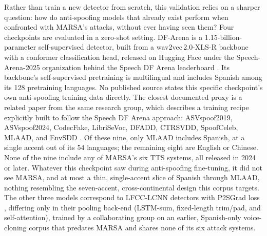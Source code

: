 \documentclass[11pt]{report}
\begin{document}
Rather than train a new detector from scratch, this validation relies
on a sharper question: how do anti-spoofing models that already exist
perform when confronted with MARSA's attacks, without ever having seen
them? Four checkpoints are evaluated in a zero-shot setting. DF-Arena is
a 1.15-billion-parameter self-supervised detector, built from a
wav2vec\,2.0-XLS-R backbone \citep{babu2022xlsr} with a conformer
classification head, released on Hugging Face under the
Speech-Arena-2025 organization behind the Speech DF Arena leaderboard
\citep{dowerah2025speechdfarena}. Its backbone's self-supervised
pretraining is multilingual and includes Spanish among its 128
pretraining languages. No published source states this specific
checkpoint's own anti-spoofing training data directly. The closest
documented proxy is a related paper from the same research group, which
describes a training recipe explicitly built to follow the Speech DF
Arena approach: ASVspoof2019, ASVspoof2024, CodecFake, LibriSeVoc,
DFADD, CTRSVDD, SpoofCeleb, MLAAD, and EnvSDD \citep{raptor2026}. Of
these nine, only MLAAD includes Spanish, at a single accent out of its
54 languages; the remaining eight are English or Chinese. None of the
nine include any of MARSA's six TTS systems, all released in 2024 or
later. Whatever this checkpoint saw during anti-spoofing fine-tuning,
it did not see MARSA, and at most a thin, single-accent slice of
Spanish through MLAAD, nothing resembling the seven-accent,
cross-continental design this corpus targets. The other three models
correspond to LFCC-LCNN detectors with P2SGrad loss
\citep{wang2021comparative}, differing only in their pooling back-end
(LSTM-sum, fixed-length trim/pad, and self-attention), trained by a
collaborating group on an earlier, Spanish-only voice-cloning corpus
that predates MARSA and shares none of its six attack systems.
\end{document}
